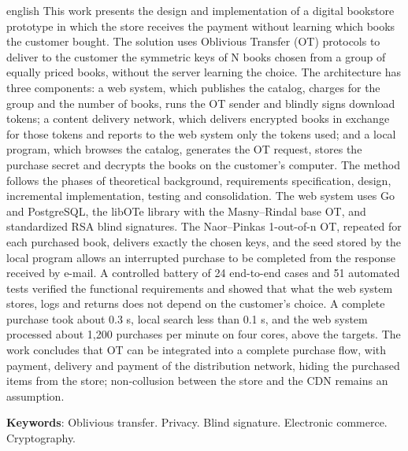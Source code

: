 \documentclass[
	12pt,				%
	openright,			%
	twoside,			%
	a4paper,			%
	english,			%
	french,				%
	spanish,			%
	brazil				%
	]{abntex2}
\begin{document}
\begin{resumo}[Abstract]
 \begin{otherlanguage*}{english}
   This work presents the design and implementation of a digital bookstore
   prototype in which the store receives the payment without learning which
   books the customer bought. The solution uses Oblivious Transfer (OT)
   protocols to deliver to the customer the symmetric keys of N books chosen
   from a group of equally priced books, without the server learning the
   choice. The architecture has three components: a web system, which publishes
   the catalog, charges for the group and the number of books, runs the OT
   sender and blindly signs download tokens; a content delivery network, which
   delivers encrypted books in exchange for those tokens and reports to the web
   system only the tokens used; and a local program, which browses the catalog,
   generates the OT request, stores the purchase secret and decrypts the books
   on the customer's computer. The method follows the phases of theoretical
   background, requirements specification, design, incremental implementation,
   testing and consolidation. The web system uses Go and PostgreSQL, the libOTe
   library with the Masny--Rindal base OT, and standardized RSA blind
   signatures. The Naor--Pinkas 1-out-of-n OT, repeated for each purchased
   book, delivers exactly the chosen keys, and the seed stored by the local
   program allows an interrupted purchase to be completed from the response
   received by e-mail. A controlled battery of 24 end-to-end cases and 51
   automated tests verified the functional requirements and showed that what
   the web system stores, logs and returns does not depend on the customer's
   choice. A complete purchase took about 0.3 s, local search less than 0.1 s,
   and the web system processed about 1,200 purchases per minute on four
   cores, above the targets. The work concludes that OT can be integrated into
   a complete purchase flow, with payment, delivery and payment of the
   distribution network, hiding the purchased items from the store; non-collusion
   between the store and the CDN remains an assumption.

   \vspace{\onelineskip}

   \noindent
   \textbf{Keywords}: Oblivious transfer. Privacy. Blind signature. Electronic commerce. Cryptography.
 \end{otherlanguage*}
\end{resumo}
\end{document}
